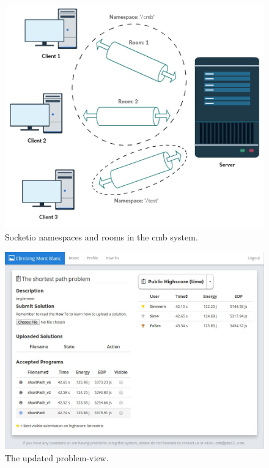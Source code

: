 \begin{figure}
    \includegraphics[width=1.0\textwidth]{figs/namespaces_and_rooms.jpg}
    \caption[Socketio namespaces and rooms in the \gls{cmb} system]{Socketio namespaces and rooms in the \gls{cmb} system. }
    \label{fig:namespaces-and-rooms}
\end{figure}

\clearpage

\begin{figure}
    \includegraphics[width=1.0\textwidth]{figs/problem_view.jpg}
    \caption[The updated problem-view]{The updated problem-view.}
    \label{fig:problem-view}
\end{figure}


